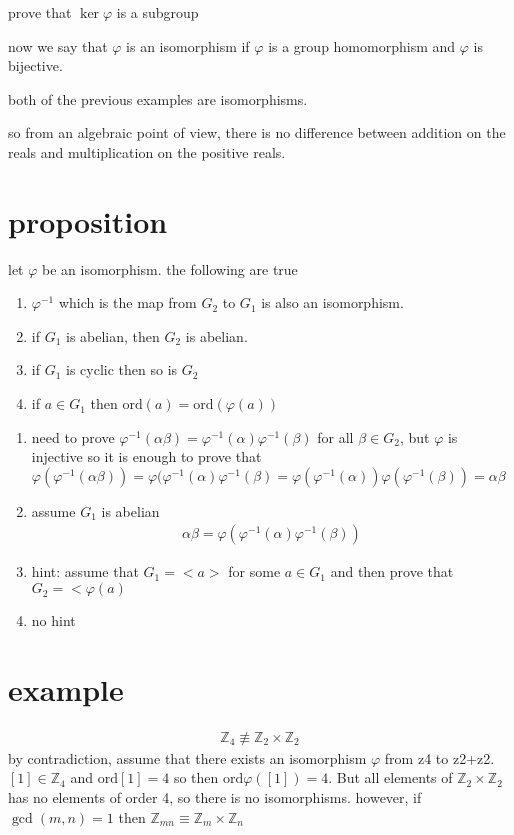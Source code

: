 \documentclass[letterpaper]{article}
\begin{document}
prove that $\ker \varphi$ is a subgroup

now we say that $\varphi$ is an isomorphism if $\varphi$ is a group homomorphism and $\varphi$ is bijective.

both of the previous examples are isomorphisms.

so from an algebraic point of view, there is no difference between addition on the reals and multiplication on the positive reals.

\section*{proposition}
let $\varphi$ be an isomorphism. the following are true
\begin{enumerate}
\item
$\varphi^{-1}$ which is the map from $G_2$ to $G_1$ is also an isomorphism.
\item
if $G_1$ is abelian, then $G_2$ is abelian.
\item
if $G_1$ is cyclic then so is $G_2$
\item
if $a\in G_1$ then $\text{ord}(a)=\text{ord}(\varphi(a))$
\end{enumerate}

\begin{enumerate}
\item
need to prove $\varphi^{-1}(\alpha\beta)=\varphi^{-1}(\alpha)\varphi^{-1}(\beta)$ for all $\beta\in G_2$, but $\varphi$ is injective so it is enough to prove that $\varphi(\varphi^{-1}(\alpha\beta))=\varphi(\varphi^{-1}(\alpha)\varphi^{-1}(\beta)=\varphi(\varphi^{-1}(\alpha))\varphi(\varphi^{-1}(\beta))=\alpha\beta$
\item
assume $G_1$ is abelian
\begin{align*}
  \alpha\beta=\varphi(\varphi^{-1}\left(\alpha\right)\varphi^{-1}(\beta))
\end{align*}
\item
hint: assume that $G_1=<a>$ for some $a\in G_1$ and then prove that $G_2=<\varphi(a)$
\item
no hint
\end{enumerate}
\section*{example}
\begin{align*}
  \mathbb{Z}_4\not\equiv\mathbb{Z}_2\times\mathbb{Z}_2
\end{align*}
by contradiction, assume that there exists an isomorphism $\varphi$ from z4 to z2+z2. $[1]\in \mathbb{Z}_4$ and $\text{ord}[1]=4$ so then $\text{ord}\varphi([1])=4$. But all elements of $\mathbb{Z}_2\times\mathbb{Z}_2$ has no elements of order 4, so there is no isomorphisms. however, if $\gcd(m,n)=1$ then $\mathbb{Z}_{mn}\equiv\mathbb{Z}_m\times\mathbb{Z}_n$
\end{document}
